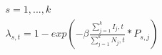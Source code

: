 \documentclass[10pt]{article}
\begin{document}
\begin{align*}
s = 1,...,k \\
\lambda_{s,t} = 1 - exp(-\beta\frac{\sum_{j=1}^{k} I_j,t}{\sum_{j=1}^{k}N_j,t}*P_{s,j})\end{align*}
\end{document}
